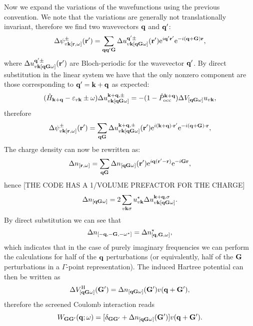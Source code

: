 \documentclass[twocolumn,prb,showpacs,superscriptaddress]{revtex4}
\def\w{\omega}
\def\H{\hat{H}}
\def\P{\hat{P}_{\rm occ}}
\def\E{\varepsilon}
\def\q{{\bf q}}
\def\s{\sigma}
\def\k{{\bf k}}
\def\qp{{\bf q^\prime}}
\def\G{{\bf G}}
\def\Gp{{\bf G^\prime}}
\def\r{{\bf r}}
\def\rp{{\bf r^\prime}}
\begin{document}
Now we expand the variations of the wavefunctions using the previous convention.
We note that the variations are generally not translationally invariant, therefore
we find two wavevectors $\q$ and $\qp$:
  \begin{equation}
  \Delta \psi^\pm_{v\k[\r,\w]} (\rp) = \sum_{\q\qp\G} \Delta u^{\qp\pm}_{v\k[\q\G\w]} (\rp) 
  {\rm e}^{i\qp\rp} {\rm e}^{-i(\q+\G)\r}, 
  \end{equation}
where $\Delta u^{\qp\pm}_{v\k[\q\G\w]} (\rp)$ are Bloch-periodic for the wavevector $\qp$.
By direct substitution in the linear system we have that the only nonzero component
are those corresponding to $\qp=\k+\q$ as expected:
  \begin{equation}
  (\H_{\k+\q}-\E_{v\k}\pm\w) \Delta u^{\k+\q,\pm}_{v\k[\q\G\w]}  = -(1-\P^{\k+\q}) \Delta V_{[\q\G\w]} u_{v\k},
  \end{equation}
therefore
  \begin{equation}
  \Delta \psi^\pm_{v\k[\r,\w]} (\rp) = \sum_{\q\G} \Delta u^{\k+\q,\pm}_{v\k[\q\G\w]} (\rp)
  {\rm e}^{i(\k+\q)\cdot\rp} {\rm e}^{-i(\q+\G)\cdot\r},
  \end{equation}
The charge density can now be rewritten as:
  \begin{equation}
  \Delta n_{[\r,\w]} = \sum_{\q\G} \Delta n_{[\q\G\w]}(\rp) {\rm e}^{i\q(\rp-\r)} {\rm e}^{-i\G\r},
  \end{equation}
hence [THE CODE HAS A 1/VOLUME PREFACTOR FOR THE CHARGE]
  \begin{equation}
  \Delta n_{[\q\G\w]} = 2\sum_{v\k\s} u_{v\k}^\star  \Delta u^{\k+\q,\s}_{v\k[\q\G\w]}.
  \end{equation}
By direct substitution we can see that
  \begin{equation}
  \Delta n_{[-\q,-\G,-\w^\star]} = \Delta n^\star_{[\q,\G,\w]},
  \end{equation}
which indicates that in the case of purely imaginary frequencies we can perform
the calculations for half of the $\q$ perturbations (or equivalently, half of the
$\G$ perturbations in a $\Gamma$-point representation).
The induced Hartree potential can then be written as 
  \begin{equation}
  \Delta V^{\rm H}_{[\q\G\w]}(\Gp) = \Delta n_{[\q\G\w]}(\Gp) v(\q+\Gp), 
  \end{equation}
therefore the screened Coulomb interaction reads
  \begin{equation}
  W_{\G\Gp}(\q;\w) = [\delta_{\G\Gp} + \Delta n_{[\q\G\w]}(\Gp) ]v(\q+\Gp).
  \end{equation}
\end{document}

